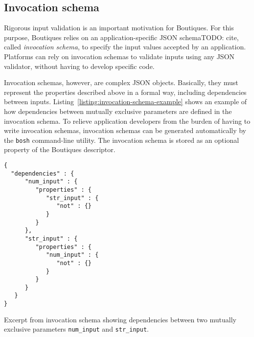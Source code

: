 \documentclass{article}
\newcommand{\todo}[1]{\color{red}TODO: #1\color{black}}
\newcommand{\boutiques}{Boutiques\xspace}
\newcommand{\notimplementedyet}[1]{\color{blue}\emph{#1}\footnote{Still needs to be implemented}\color{black}\xspace}
\begin{document}
\subsection{Invocation schema}
\label{sec:invocation-schema}

Rigorous input validation is an important motivation for
\boutiques. For this purpose, \boutiques relies on an
application-specific JSON schema\todo{cite}, called \emph{invocation schema}, to
specify the input values accepted by an application. Platforms can
rely on invocation schemas to validate inputs using
any JSON validator, without having to develop specific code.

Invocation schemas, however, are complex JSON objects. Basically, they
must represent the properties described above in a formal way,
including dependencies between
inputs. Listing~\ref{listing:invocation-schema-example} shows an
example of how dependencies between mutually exclusive parameters are
defined in the invocation schema. To relieve application developers
from the burden of having to write invocation schemas, invocation
schemas can be generated automatically by the \texttt{bosh}
command-line utility. The invocation schema is stored as an optional
property of the \boutiques descriptor.


\begin{listing}
\begin{verbatim}
{
  "dependencies" : {
      "num_input" : {
         "properties" : {
            "str_input" : {
               "not" : {}
            }
         }
      },
      "str_input" : {
         "properties" : {
            "num_input" : {
               "not" : {}
            }
         }
      }
   }
}
\end{verbatim}
\caption{Excerpt from invocation schema showing dependencies between
  two mutually exclusive parameters \texttt{num\_input} and
  \texttt{str\_input}.}
\label{listing:invocation-schema-example}
\end{listing}
\end{document}
